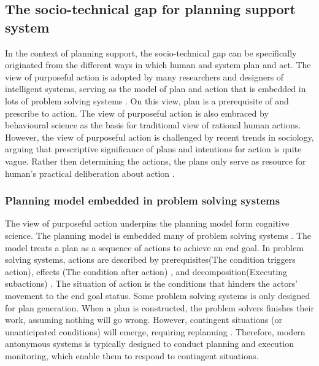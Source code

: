 \subsection{The socio-technical gap for planning support system}
In the context of planning support, the socio-technical gap can be specifically originated from the different ways in which human and system plan and act. The view of purposeful action is adopted by many researchers and designers of intelligent systems, serving as the model of plan and action that is embedded in lots of problem solving systems \cite{Allen1984}. On this view, plan is a prerequisite of and prescribe to action. The view of purposeful action is also embraced by behavioural science as the basis for traditional view of rational human actions. However, the view of purposeful action is challenged by recent trends in sociology, arguing that prescriptive significance of plans and intentions for action is quite vague. Rather then determining the actions, the plans only serve as resource for human's practical deliberation about action \cite{Suchman1987}.\\  

\subsubsection{Planning model embedded in problem solving systems }
The view of purposeful action underpins the planning model form cognitive science. The planning model is embedded many of problem solving systems \cite{Suchman1987}. The model treats a plan as a sequence of actions to achieve an end goal. In problem solving systems, actions are described by prerequisites(The condition triggers action), effects (The condition after action) , and decomposition(Executing subactions) \cite{Allen1984}. The situation of action is the conditions that hinders the actors' movement to the end goal status. Some problem solving systems is only designed for plan generation. When a plan is constructed, the problem solvers finishes their work, assuming nothing will go wrong. However, contingent situations (or unanticipated conditions) will emerge, requiring replanning \cite{Suchman1987}. Therefore, modern antonymous systems is typically designed to conduct planning and execution monitoring, which enable them to respond to contingent situations.\\


